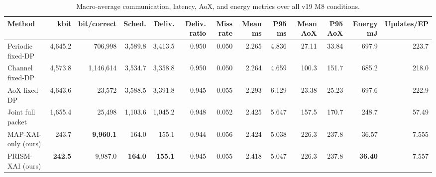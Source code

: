 

\begin{table}[t]
\centering
\caption{Macro-average communication, latency, AoX, and energy metrics over all v19 M8 conditions.}
\label{tab:macronet}
\scriptsize
\setlength{\tabcolsep}{3pt}
\renewcommand{\arraystretch}{1.08}

\begin{adjustbox}{max width=\textwidth}
\begin{tabular}{lrrrrrrrrrrrr}
\toprule
Method
& kbit
& bit/correct
& Sched.
& Deliv.
& Deliv. ratio
& Miss rate
& Mean ms
& P95 ms
& Mean AoX
& P95 AoX
& Energy mJ
& Updates/EP \\
\midrule

Periodic fixed-DP
& 4,645.2
& 706,998
& 3,589.8
& 3,413.5
& 0.950
& 0.050
& 2.265
& 4.836
& 27.11
& 33.84
& 697.9
& 223.7 \\

Channel fixed-DP
& 4,573.8
& 1,146,614
& 3,534.7
& 3,358.8
& 0.950
& 0.050
& 2.264
& 4.659
& 100.3
& 151.7
& 685.2
& 218.0 \\

AoX fixed-DP
& 4,643.6
& 23,572
& 3,588.5
& 3,391.8
& 0.945
& 0.055
& 2.293
& 6.129
& 23.38
& 25.23
& 697.6
& 222.9 \\

Joint full packet
& 1,655.4
& 25,498
& 1,103.6
& 1,045.2
& 0.948
& 0.052
& 2.425
& 5.647
& 157.5
& 170.7
& 248.7
& 57.49 \\

\midrule

MAP-XAI-only (ours)
& 243.7
& \textbf{9,960.1}
& 164.0
& 155.1
& 0.944
& 0.056
& 2.424
& 5.038
& 226.3
& 237.8
& 36.57
& 7.555 \\

PRISM-XAI (ours)
& \textbf{242.5}
& 9,987.0
& \textbf{164.0}
& \textbf{155.1}
& 0.945
& 0.055
& 2.418
& 5.047
& 226.3
& 237.8
& \textbf{36.40}
& 7.557 \\

\bottomrule
\end{tabular}
\end{adjustbox}
\end{table}